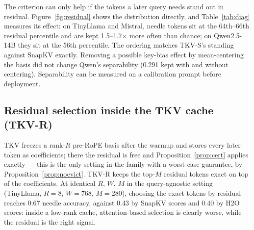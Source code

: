 \documentclass{article}
\begin{document}
The criterion can only help if the tokens a later query needs stand out in
residual. Figure~\ref{fig:residual} shows the distribution directly, and
Table~\ref{tab:diag} measures its effect: on TinyLlama and Mistral,
needle tokens sit at the 64th--66th residual percentile and are kept
1.5--1.7$\times$ more often than chance; on Qwen2.5-14B they sit at the 56th
percentile. The ordering matches TKV-S's standing against SnapKV exactly. Removing a possible key-bias effect by mean-centering the basis did
not change Qwen's separability (0.291 kept with and without centering).
Separability can be measured on a calibration prompt before deployment.

\subsection{Residual selection inside the TKV cache (TKV-R)}
\label{sec:tkvr}

TKV freezes a rank-$R$ pre-RoPE basis after the warmup and stores every later
token as coefficients; there the residual is free and
Proposition~\ref{prop:cert} applies exactly --- this is the only setting in
the family with a worst-case guarantee, by Proposition~\ref{prop:noevict}. TKV-R keeps the top-$M$
residual tokens exact on top of the coefficients. At identical $R$, $W$, $M$
in the query-agnostic setting (TinyLlama, $R{=}8$, $W{=}768$, $M{=}280$),
choosing the exact tokens by residual reaches 0.67 needle accuracy, against
0.43 by SnapKV scores and 0.40 by H2O scores: inside a low-rank cache,
attention-based selection is clearly worse, while the residual is the right
signal.
\end{document}
